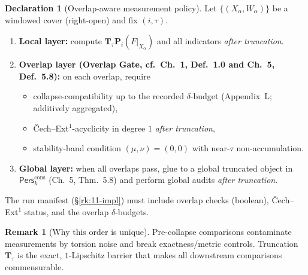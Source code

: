 \documentclass[11pt]{article}
\numberwithin{equation}{section}
\theoremstyle{plain}
\theoremstyle{definition}
\theoremstyle{remark}
\newcommand{\Pers}{\mathsf{Pers}}
\theoremstyle{plain}
\theoremstyle{definition}
\numberwithin{equation}{section}
\theoremstyle{definition}
\newtheorem{remark}[theorem]{Remark}
\newtheorem{declaration}[theorem]{Declaration}
\numberwithin{equation}{section}
\theoremstyle{plain}
\theoremstyle{definition}
\theoremstyle{remark}
\begin{document}
\begin{declaration}[Overlap-aware measurement policy]\label{dec:11-og-policy}
Let $\{(X_\alpha,W_\alpha)\}$ be a windowed cover (right-open) and fix $(i,\tau)$.
\begin{enumerate}
\item \textbf{Local layer:} compute $\mathbf{T}_\tau\mathbf{P}_i(F|_{X_\alpha})$ and all indicators \emph{after truncation}.
\item \textbf{Overlap layer (Overlap Gate, cf.\ Ch.~1, Def.~1.0 and Ch.~5, Def.~5.8):} on each overlap, require
\begin{itemize}
  \item collapse-compatibility up to the recorded $\delta$-budget (Appendix~L; additively aggregated),
  \item Čech–Ext$^1$-acyclicity in degree $1$ \emph{after truncation},
  \item stability-band condition $(\mu,\nu)=(0,0)$ with near-$\tau$ non-accumulation.
\end{itemize}
\item \textbf{Global layer:} when all overlaps pass, glue to a global truncated object in $\Pers^{\mathrm{cons}}_k$ (Ch.~5, Thm.~5.8) and perform global audits \emph{after truncation}.
\end{enumerate}
The run manifest (\S\ref{rk:11-impl}) must include overlap checks (boolean), Čech–Ext$^1$ status, and the overlap $\delta$-budgets.
\end{declaration}

\begin{remark}[Why this order is unique]
Pre-collapse comparisons contaminate measurements by torsion noise and break exactness/metric controls. Truncation $\mathbf{T}_\tau$ is the exact, $1$-Lipschitz barrier that makes all downstream comparisons commensurable.
\end{remark}
\end{document}

